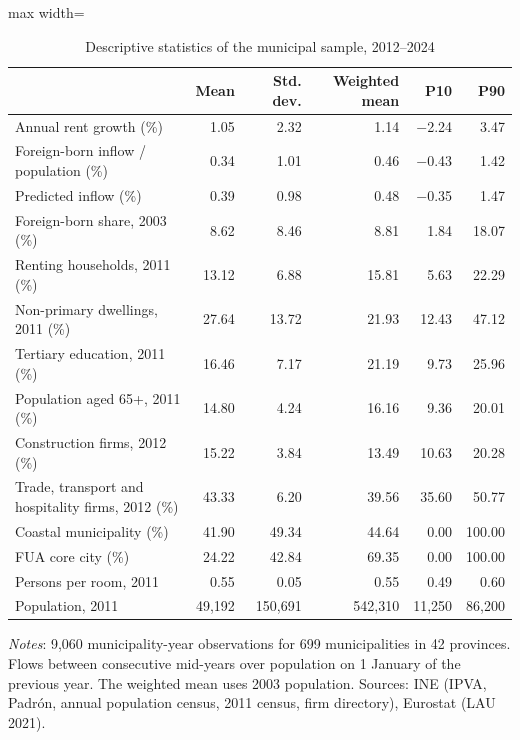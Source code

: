 \begin{table}[!htbp]\centering\small
\caption{Descriptive statistics of the municipal sample, 2012--2024}\label{tab:desc}
\begin{adjustbox}{max width=\linewidth}\begin{tabular}{lrrrrr}\toprule
 & Mean & Std. dev. & Weighted mean & P10 & P90 \\ \midrule
Annual rent growth (\%) & 1.05 & 2.32 & 1.14 & $-$2.24 & 3.47\\
Foreign-born inflow / population (\%) & 0.34 & 1.01 & 0.46 & $-$0.43 & 1.42\\
Predicted inflow (\%) & 0.39 & 0.98 & 0.48 & $-$0.35 & 1.47\\
Foreign-born share, 2003 (\%) & 8.62 & 8.46 & 8.81 & 1.84 & 18.07\\
Renting households, 2011 (\%) & 13.12 & 6.88 & 15.81 & 5.63 & 22.29\\
Non-primary dwellings, 2011 (\%) & 27.64 & 13.72 & 21.93 & 12.43 & 47.12\\
Tertiary education, 2011 (\%) & 16.46 & 7.17 & 21.19 & 9.73 & 25.96\\
Population aged 65+, 2011 (\%) & 14.80 & 4.24 & 16.16 & 9.36 & 20.01\\
Construction firms, 2012 (\%) & 15.22 & 3.84 & 13.49 & 10.63 & 20.28\\
Trade, transport and hospitality firms, 2012 (\%) & 43.33 & 6.20 & 39.56 & 35.60 & 50.77\\
Coastal municipality (\%) & 41.90 & 49.34 & 44.64 & 0.00 & 100.00\\
FUA core city (\%) & 24.22 & 42.84 & 69.35 & 0.00 & 100.00\\
Persons per room, 2011 & 0.55 & 0.05 & 0.55 & 0.49 & 0.60\\
Population, 2011 & 49,192 & 150,691 & 542,310 & 11,250 & 86,200\\
\bottomrule\end{tabular}\end{adjustbox}
\begin{minipage}{0.95\linewidth}\footnotesize\vspace{4pt}\textit{Notes}: 9,060 municipality-year observations for 699 municipalities in 42 provinces. Flows between consecutive mid-years over population on 1 January of the previous year. The weighted mean uses 2003 population. Sources: INE (IPVA, Padrón, annual population census, 2011 census, firm directory), Eurostat (LAU 2021).\end{minipage}\end{table}